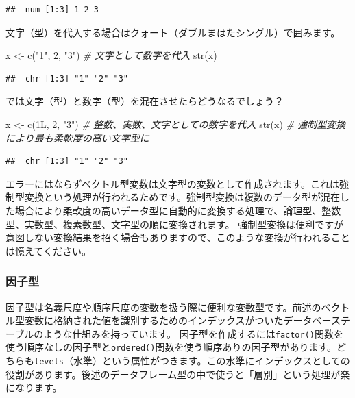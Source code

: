 \documentclass[
  12pt,
]{book}
\newenvironment{Shaded}{\begin{snugshade}}{\end{snugshade}}
\newcommand{\CommentTok}[1]{\textcolor[rgb]{0.56,0.35,0.01}{\textit{#1}}}
\newcommand{\DecValTok}[1]{\textcolor[rgb]{0.00,0.00,0.81}{#1}}
\newcommand{\FunctionTok}[1]{\textcolor[rgb]{0.00,0.00,0.00}{#1}}
\newcommand{\NormalTok}[1]{#1}
\newcommand{\OtherTok}[1]{\textcolor[rgb]{0.56,0.35,0.01}{#1}}
\newcommand{\StringTok}[1]{\textcolor[rgb]{0.31,0.60,0.02}{#1}}
\begin{document}
\begin{verbatim}
##  num [1:3] 1 2 3
\end{verbatim}

文字（型）を代入する場合はクォート（ダブルまはたシングル）で囲みます。

\begin{Shaded}
\begin{Highlighting}[]
\NormalTok{x }\OtherTok{\textless{}{-}} \FunctionTok{c}\NormalTok{(}\StringTok{"1"}\NormalTok{, }\StringTok{\textquotesingle{}2\textquotesingle{}}\NormalTok{, }\StringTok{"3"}\NormalTok{)   }\CommentTok{\# 文字として数字を代入}
\FunctionTok{str}\NormalTok{(x)}
\end{Highlighting}
\end{Shaded}

\begin{verbatim}
##  chr [1:3] "1" "2" "3"
\end{verbatim}

では文字（型）と数字（型）を混在させたらどうなるでしょう？

\begin{Shaded}
\begin{Highlighting}[]
\NormalTok{x }\OtherTok{\textless{}{-}} \FunctionTok{c}\NormalTok{(1L, }\DecValTok{2}\NormalTok{, }\StringTok{"3"}\NormalTok{)      }\CommentTok{\# 整数、実数、文字としての数字を代入}
\FunctionTok{str}\NormalTok{(x)                  }\CommentTok{\# 強制型変換により最も柔軟度の高い文字型に}
\end{Highlighting}
\end{Shaded}

\begin{verbatim}
##  chr [1:3] "1" "2" "3"
\end{verbatim}

エラーにはならずベクトル型変数は文字型の変数として作成されます。これは強制型変換という処理が行われるためです。強制型変換は複数のデータ型が混在した場合により柔軟度の高いデータ型に自動的に変換する処理で、論理型、整数型、実数型、複素数型、文字型の順に変換されます。 強制型変換は便利ですが意図しない変換結果を招く場合もありますので、このような変換が行われることは憶えてください。

\hypertarget{ux56e0ux5b50ux578b}{%
\subsubsection{因子型}\label{ux56e0ux5b50ux578b}}

因子型は名義尺度や順序尺度の変数を扱う際に便利な変数型です。前述のベクトル型変数に格納された値を識別するためのインデックスがついたデータベーステーブルのような仕組みを持っています。 因子型を作成するには\texttt{factor()}関数を使う順序なしの因子型と\texttt{ordered()}関数を使う順序ありの因子型があります。どちらも\texttt{levels}（水準）という属性がつきます。この水準にインデックスとしての役割があります。後述のデータフレーム型の中で使うと「層別」という処理が楽になります。
\end{document}
